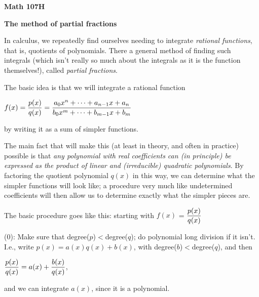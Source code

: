 
\def\ctln{\centerline}
\def\ni{\noindent}
\def\ssk{\smallskip}
\def\msk{\medskip}
\def\bsk{\bigskip}
\def\hsk{\hskip.2in}
\def\hhsk{\hskip.3in}
\def\ra{$\rightarrow$}
\def\ubr{\underbar}

\baselineskip=10pt
\nopagenumbers
\parindent=0pt

\ctln{\bf Math 107H}

\msk

\ctln{\bf The method of partial fractions}

\bsk

In calculus, we
repeatedly find ourselves needing to integrate {\it rational functions}, that
is, quotients of polynomials. There a general method 
of finding such integrals (which isn't really so much about the integrals
as it is the function themselves!), called {\it partial fractions}.

\bsk

The basic idea is that we will integrate a rational function

\ctln{$\displaystyle f(x) = {{p(x)}\over{q(x)}} = {{a_0x^n+\cdots +a_{n-1}x+a_n}\over{b_0x^m+\cdots +b_{m-1}x+b_m}}$}

by writing it as a sum of simpler functions.

\msk

The main fact that will make this (at least in theory, and often in practice) possible is that {\it any
polynomial with real coefficients can (in principle) be expressed as the product of linear and (irreducible)
quadratic polynomials}. By factoring the quotient polynomial $q(x)$ in this way, we can determine
what the simpler functions will look like; a procedure very much like undetermined coefficients will
then allow us to determine exactly what the simpler pieces are.

\msk

The basic procedure goes like this: starting with  $f(x)$ = $\displaystyle{{p(x)}\over{q(x)}}$

\msk

(0): Make sure that degree($p$)$<$degree($q$); do polynomial long division if it isn't. I.e., write
$p(x) = a(x)q(x)+b(x)$, with degree($b$)$<$degree($q$), and then 

\ssk

\ctln{$\displaystyle {{p(x)}\over{q(x)}} =  a(x) + {{b(x)}\over{q(x)}}$,}

\ssk

and we can integrate $a(x)$, since it is a polynomial. 


